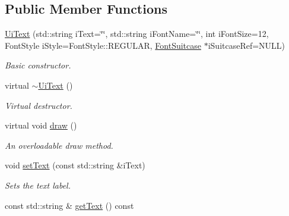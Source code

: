 \subsection*{Public Member Functions}
\begin{DoxyCompactItemize}
\item 
\hypertarget{class_ui_text_a1c1f843f43e8876eebd7948e99cd2c6d}{\hyperlink{class_ui_text_a1c1f843f43e8876eebd7948e99cd2c6d}{Ui\-Text} (std\-::string i\-Text=\char`\"{}\char`\"{}, std\-::string i\-Font\-Name=\char`\"{}\char`\"{}, int i\-Font\-Size=12, Font\-Style i\-Style=Font\-Style\-::\-R\-E\-G\-U\-L\-A\-R, \hyperlink{class_font_suitcase}{Font\-Suitcase} $\ast$i\-Suitcase\-Ref=N\-U\-L\-L)}\label{class_ui_text_a1c1f843f43e8876eebd7948e99cd2c6d}

\begin{DoxyCompactList}\small\item\em Basic constructor. \end{DoxyCompactList}\item 
\hypertarget{class_ui_text_a3cad6660a0ad513269a5a5e2641be690}{virtual \hyperlink{class_ui_text_a3cad6660a0ad513269a5a5e2641be690}{$\sim$\-Ui\-Text} ()}\label{class_ui_text_a3cad6660a0ad513269a5a5e2641be690}

\begin{DoxyCompactList}\small\item\em Virtual destructor. \end{DoxyCompactList}\item 
\hypertarget{class_ui_text_a9bec6f9afac66ec56e7ddc173abdeee7}{virtual void \hyperlink{class_ui_text_a9bec6f9afac66ec56e7ddc173abdeee7}{draw} ()}\label{class_ui_text_a9bec6f9afac66ec56e7ddc173abdeee7}

\begin{DoxyCompactList}\small\item\em An overloadable draw method. \end{DoxyCompactList}\item 
\hypertarget{class_ui_text_a85be4717dc7254136968a7efb3983c42}{void \hyperlink{class_ui_text_a85be4717dc7254136968a7efb3983c42}{set\-Text} (const std\-::string \&i\-Text)}\label{class_ui_text_a85be4717dc7254136968a7efb3983c42}

\begin{DoxyCompactList}\small\item\em Sets the text label. \end{DoxyCompactList}\item 
\hypertarget{class_ui_text_a7b8f3d26de23f8caf82d704f9a5d966c}{const std\-::string \& \hyperlink{class_ui_text_a7b8f3d26de23f8caf82d704f9a5d966c}{get\-Text} () const }\label{class_ui_text_a7b8f3d26de23f8caf82d704f9a5d966c}


\end{DoxyCompactItemize}
